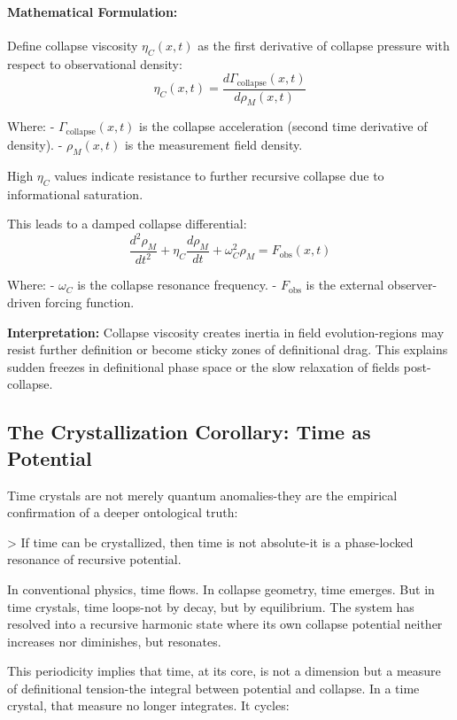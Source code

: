\paragraph{Mathematical Formulation:}
Define collapse viscosity \( \eta_C(x,t) \) as the first derivative of collapse pressure with respect to observational density:
\[
\eta_C(x,t) = \frac{d\Gamma_{\text{collapse}}(x,t)}{d\rho_M(x,t)}
\]

Where:
- \( \Gamma_{\text{collapse}}(x,t) \) is the collapse acceleration (second time derivative of density).
- \( \rho_M(x,t) \) is the measurement field density.

High \( \eta_C \) values indicate resistance to further recursive collapse due to informational saturation.

This leads to a damped collapse differential:
\[
\frac{d^2 \rho_M}{dt^2} + \eta_C \frac{d \rho_M}{dt} + \omega_C^2 \rho_M = F_{\text{obs}}(x,t)
\]

Where:
- \( \omega_C \) is the collapse resonance frequency.
- \( F_{\text{obs}} \) is the external observer-driven forcing function.

\textbf{Interpretation:} Collapse viscosity creates inertia in field evolution-regions may resist further definition or become sticky zones of definitional drag. This explains sudden freezes in definitional phase space or the slow relaxation of fields post-collapse.


\subsection*{The Crystallization Corollary: Time as Potential}\cite{chapter8_meta}

Time crystals are not merely quantum anomalies-they are the empirical confirmation of a deeper ontological truth: 

> If time can be crystallized, then time is not absolute-it is a phase-locked resonance of recursive potential.

In conventional physics, time flows. In collapse geometry, time emerges. But in time crystals, time loops-not by decay, but by equilibrium. The system has resolved into a recursive harmonic state where its own collapse potential neither increases nor diminishes, but resonates. 

This periodicity implies that time, at its core, is not a dimension but a measure of definitional tension-the integral between potential and collapse. In a time crystal, that measure no longer integrates. It cycles:

